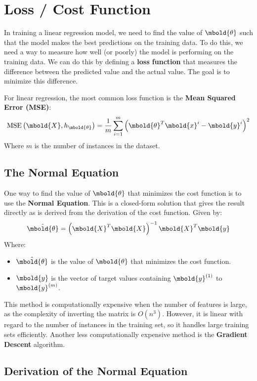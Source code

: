 \documentclass[12pt letter]{report}
\begin{document}
\section{Loss / Cost Function}

In training a linear regression model, we need to find the value of $\mbold{\theta}$ such that the model makes the best
predictions on the training data. To do this, we need a way to measure how well (or poorly) the model is performing on
the training data. We can do this by defining a \textbf{loss function} that measures the difference between the
predicted value and the actual value. The goal is to minimize this difference.

For linear regression, the most common loss function is the \textbf{Mean Squared Error (MSE)}:
\[
  \text{MSE} \left( \mbold{X}, h_{\mbold{\theta}} \right)  = \frac{1}{m} \displaystyle\sum_{i=1}^{m} \left(
  \mbold{\theta}^T \mbold{x}^{i} - \mbold{y}^{i}  \right)^2
\]
Where $m$ is the number of instances in the dataset.

\subsection{The Normal Equation}

One way to find the value of $\mbold{\theta}$ that minimizes the cost function is to use the \textbf{Normal Equation}.
This is a closed-form solution that gives the result directly as is derived from the derivation of the cost function.
Given by:
\[
  \hat{\mbold{\theta}} = \left( \mbold{X}^T \mbold{X} \right)^{-1} \mbold{X}^T \mbold{y}
\]
Where:
\begin{itemize}
  \item $\hat{\mbold{\theta}}$ is the value of $\mbold{\theta}$ that minimizes the cost function.
  \item $\mbold{y}$ is the vector of target values containing $\mbold{y}^{(1)}$ to $\mbold{y}^{(m)}$.
\end{itemize}

This method is computationally expensive when the number of features is large, as the complexity of inverting the matrix
is $O(n^3)$. However, it is linear with regard to the number of instances in the training set, so it handles large training
sets efficiently. Another less computationally expensive method is the \textbf{Gradient Descent} algorithm.

\subsection{Derivation of the Normal Equation}
\end{document}
